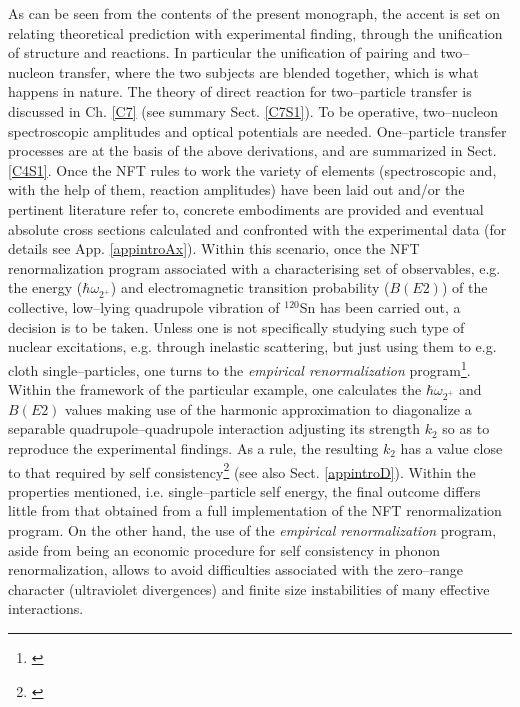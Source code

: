 As can be seen from the contents of the present monograph, the accent is set on relating theoretical prediction with experimental finding, through the unification of structure and reactions. In particular the unification of pairing and two--nucleon transfer, where the two subjects are blended together, which is what happens in nature.
The theory of direct reaction for two--particle transfer is discussed in Ch. \ref{C7} (see summary Sect. \ref{C7S1}). To be operative, two--nucleon spectroscopic amplitudes and optical potentials are needed. One--particle transfer processes are at the basis of the above derivations, and are summarized in Sect. \ref{C4S1}. Once the NFT rules to work the variety of elements (spectroscopic and, with the help of them, reaction amplitudes) have been laid  out and/or the pertinent literature refer to, concrete embodiments are provided and eventual absolute cross sections calculated and confronted with the experimental data (for details see App. \ref{appintroAx}). Within this scenario, once the NFT renormalization program associated with a characterising set of observables, e.g. the energy ($\hbar \omega_{2^+}$) and electromagnetic transition probability ($B(E2)$) of the collective, low--lying quadrupole vibration of $^{120}$Sn has been carried out, a decision is to be taken. Unless one is not specifically studying such type of nuclear excitations, e.g. through inelastic scattering, but just using them to e.g. cloth single--particles, one turns to the \textit{empirical renormalization} program\footnote{\cite{Barranco:01,Idini:14,Idini:15,Broglia:16}}. Within the framework of the particular example, one calculates the $\hbar \omega_{2^+}$ and $B(E2)$ values making use of the harmonic approximation to diagonalize  a separable quadrupole--quadrupole interaction adjusting its strength $k_2$ so as to reproduce the experimental findings. As a rule, the resulting $k_2$ has a value close to that required by self consistency\footnote{\cite{Bohr:75}} (see also Sect. \ref{appintroD}). Within the properties mentioned, i.e. single--particle self energy, the final outcome differs little from  that obtained from a full implementation of the NFT renormalization program. On the other hand, the use of the \textit{empirical renormalization} program, aside from being an economic procedure for self consistency in phonon renormalization, allows to avoid difficulties associated with the zero--range character (ultraviolet divergences) and finite size instabilities of many effective  interactions.







